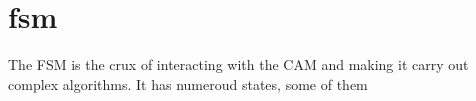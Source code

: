 \section{fsm}
The FSM is the crux of interacting with the CAM and making it carry out complex algorithms. It has numeroud states, some of them